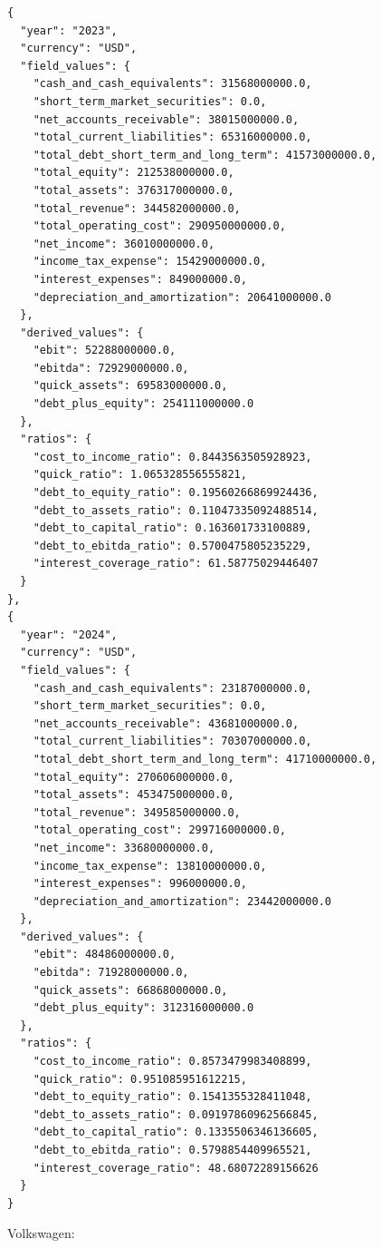 \documentclass[12pt,a4paper]{article}
\begin{document}
\begin{lstlisting}[style=json, caption={Calculated financial ratios for ExxonMobil (FY\,2023--2024)}, label=lst:ratios_exxonmobil]
{
  "year": "2023",
  "currency": "USD",
  "field_values": {
    "cash_and_cash_equivalents": 31568000000.0,
    "short_term_market_securities": 0.0,
    "net_accounts_receivable": 38015000000.0,
    "total_current_liabilities": 65316000000.0,
    "total_debt_short_term_and_long_term": 41573000000.0,
    "total_equity": 212538000000.0,
    "total_assets": 376317000000.0,
    "total_revenue": 344582000000.0,
    "total_operating_cost": 290950000000.0,
    "net_income": 36010000000.0,
    "income_tax_expense": 15429000000.0,
    "interest_expenses": 849000000.0,
    "depreciation_and_amortization": 20641000000.0
  },
  "derived_values": {
    "ebit": 52288000000.0,
    "ebitda": 72929000000.0,
    "quick_assets": 69583000000.0,
    "debt_plus_equity": 254111000000.0
  },
  "ratios": {
    "cost_to_income_ratio": 0.8443563505928923,
    "quick_ratio": 1.065328556555821,
    "debt_to_equity_ratio": 0.19560266869924436,
    "debt_to_assets_ratio": 0.11047335092488514,
    "debt_to_capital_ratio": 0.163601733100889,
    "debt_to_ebitda_ratio": 0.5700475805235229,
    "interest_coverage_ratio": 61.58775029446407
  }
},
{
  "year": "2024",
  "currency": "USD",
  "field_values": {
    "cash_and_cash_equivalents": 23187000000.0,
    "short_term_market_securities": 0.0,
    "net_accounts_receivable": 43681000000.0,
    "total_current_liabilities": 70307000000.0,
    "total_debt_short_term_and_long_term": 41710000000.0,
    "total_equity": 270606000000.0,
    "total_assets": 453475000000.0,
    "total_revenue": 349585000000.0,
    "total_operating_cost": 299716000000.0,
    "net_income": 33680000000.0,
    "income_tax_expense": 13810000000.0,
    "interest_expenses": 996000000.0,
    "depreciation_and_amortization": 23442000000.0
  },
  "derived_values": {
    "ebit": 48486000000.0,
    "ebitda": 71928000000.0,
    "quick_assets": 66868000000.0,
    "debt_plus_equity": 312316000000.0
  },
  "ratios": {
    "cost_to_income_ratio": 0.8573479983408899,
    "quick_ratio": 0.951085951612215,
    "debt_to_equity_ratio": 0.1541355328411048,
    "debt_to_assets_ratio": 0.09197860962566845,
    "debt_to_capital_ratio": 0.1335506346136605,
    "debt_to_ebitda_ratio": 0.5798854409965521,
    "interest_coverage_ratio": 48.68072289156626
  }
}
\end{lstlisting}

Volkswagen:
\end{document}
